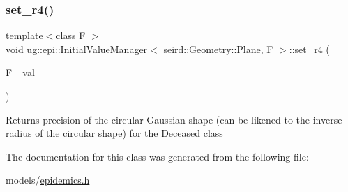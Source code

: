 \subsubsection{\texorpdfstring{set\+\_\+r4()}{set\_r4()}}
{\footnotesize\ttfamily template$<$class F $>$ \\
void \hyperlink{classug_1_1epi_1_1_initial_value_manager}{ug\+::epi\+::\+Initial\+Value\+Manager}$<$ seird\+::\+Geometry\+::\+Plane, F $>$\+::set\+\_\+r4 (\begin{DoxyParamCaption}\item[{F}]{\+\_\+val }\end{DoxyParamCaption})\hspace{0.3cm}{\ttfamily [inline]}}

Returns precision of the circular Gaussian shape (can be likened to the inverse radius of the circular shape) for the Deceased class 

The documentation for this class was generated from the following file\+:\begin{DoxyCompactItemize}
\item 
models/\hyperlink{epidemics_8h}{epidemics.\+h}\end{DoxyCompactItemize}

